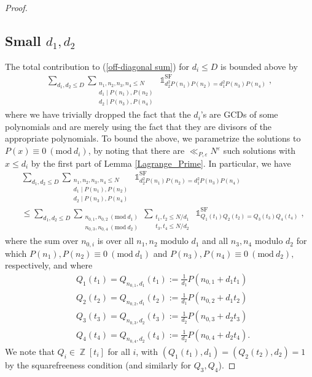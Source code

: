 \documentclass[11pts]{amsart}
\numberwithin{equation}{section}
\DeclareMathOperator{\Z}{\mathbb{Z}}
\DeclareMathOperator{\one}{\mathds{1}}
\newcommand{\Mod}[1]{\ (\text{mod}\ #1)}
\begin{document}
\begin{proof}
\subsection{Small $d_1,d_2$}
 The total contribution to (\ref{off-diagonal sum}) for $d_i\leq D$ is bounded above by
        \begin{align}
            \sum_{d_1,d_2\leq D}
            \sum_{\substack{{n_1,n_2,n_3,n_4\leq N}\\{d_1\mid P(n_1),P(n_2)}\\{d_2\mid P(n_3),P(n_4)}}}\one_{d_2^2P(n_1)P(n_2)=d_1^2P(n_3)P(n_4)}^{\text{SF}},
        \end{align}
        where we have trivially dropped the fact that the $d_i$'s are GCDs of some polynomials and are merely using the fact that they are divisors of the appropriate polynomials. To bound the above, we parametrize the solutions to $P(x)\equiv 0\Mod{d_i}$, by noting that there are $\ll_{P,\varepsilon}N^{\varepsilon}$ such solutions with $x \leq d_i$ by the first part of Lemma \ref{Lagrange_Prime}. In particular, we have
        \begin{align}
        &\sum_{d_1,d_2\leq D}
            \sum_{\substack{{n_1,n_2,n_3,n_4\leq N}\\{d_1\mid P(n_1),P(n_2)}\\{d_2\mid P(n_3),P(n_4)}}}\one_{d_2^2P(n_1)P(n_2)=d_1^2P(n_3)P(n_4)}^{\text{SF}}\\
            &\leq
            \sum_{d_1,d_2\leq D}
            \sum_{\substack{{n_{0,1},n_{0,2}\Mod{d_1}}\\{n_{0,3},n_{0,4}\Mod{d_2}}}}
            \sum_{\substack{{t_1,t_2\leq N/d_1}\\{t_3,t_4\leq N/d_2}}}\one_{Q_1(t_1)Q_2(t_2)=Q_3(t_3)Q_4(t_4)}^{\text{SF}},
        \end{align}
        where the sum over $n_{0,i}$ is over all $n_1,n_2$ modulo $d_1$ and all $n_3,n_4$ modulo $d_2$ for which $P(n_1),P(n_2)\equiv 0\Mod{d_1}$ and $P(n_3),P(n_4)\equiv 0\Mod{d_2},$ respectively, and where
        \begin{align}
            &Q_1(t_1) = Q_{n_{0,1},d_1}(t_1):=\frac{1}{d_1}P(n_{0,1}+d_1t_1)\\
            &Q_2(t_2) = Q_{n_{0,2},d_1}(t_2):=\frac{1}{d_1}P(n_{0,2}+d_1t_2)\\
            &Q_3(t_3) = Q_{n_{0,3},d_2}(t_3):=\frac{1}{d_2}P(n_{0,3}+d_2t_3)\\
            &Q_4(t_4) = Q_{n_{0,4},d_2}(t_4):=\frac{1}{d_2}P(n_{0,4}+d_2t_4).
        \end{align}
        We note that $Q_i\in\Z[t_i]$ for all $i$, with $(Q_1(t_1),d_1)=(Q_2(t_2),d_2)=1$ by the squarefreeness condition (and similarly for $Q_3,Q_4$).


\end{proof}
\end{document}
